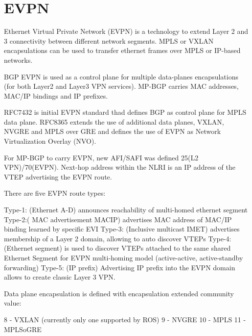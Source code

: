 
\chapter{EVPN}

Ethernet Virtual Private Network (EVPN) is a technology to extend Layer 2 and 3 connectivity between different network segments. MPLS or VXLAN encapsulations can be used to transfer ethernet frames over MPLS or IP-based networks.

BGP EVPN  is used as a control plane for multiple data-planes encapsulations (for both Layer2 and Layer3 VPN services). MP-BGP carries MAC addresses, MAC/IP bindings and IP prefixes. 

RFC7432 is initial EVPN standard thad defines BGP as control plane for MPLS data plane. RFC8365 extends the use of additional data planes, VXLAN, NVGRE and MPLS over GRE and defines the use of EVPN as Network Virtualization Overlay (NVO).

For MP-BGP to carry EVPN, new AFI/SAFI was defined 25(L2 VPN)/70(EVPN). Next-hop address within the NLRI is an IP address of the VTEP advertising the EVPN route.

There are five EVPN route types:

    Type-1: (Ethernet A-D) announces reachability of multi-homed ethernet segment
    Type-2:( MAC advertisement MACIP) advertises MAC address of MAC/IP binding learned by specific EVI
    Type-3: (Inclusive multicast IMET) advertises membership of a Layer 2 domain, allowing to auto discover VTEPs 
    Type-4: (Ethernet segment) is used to discover VTEPs attached to the same shared Ethernet Segment for EVPN multi-homing model (active-active, active-standby forwarding)
    Type-5: (IP prefix) Advertising IP prefix into the EVPN domain allows to create classic Layer 3 VPN. 

Data plane encapsulation is defined with encapsulation extended community value:

    8 - VXLAN (currently only one supported by ROS)
    9 - NVGRE
    10 - MPLS
    11 - MPLSoGRE